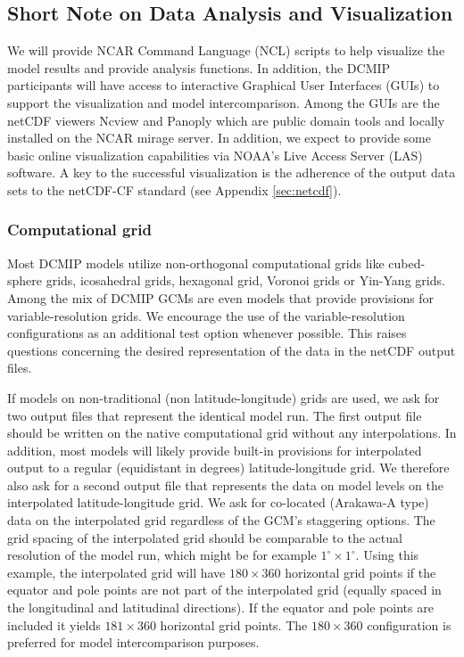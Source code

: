 \documentclass[times,doublespace]{fldauth}
\begin{document}
\subsection{Short Note on Data Analysis and Visualization}
We will provide NCAR Command Language (NCL) scripts to help visualize the model results and provide analysis functions. In addition, the DCMIP participants will have access to interactive Graphical User Interfaces (GUIs) to support the visualization and model intercomparison. Among the GUIs are the netCDF viewers Ncview and Panoply which are public domain tools and locally installed on the NCAR mirage server. In addition, we expect to provide some basic online visualization capabilities via NOAA's Live Access Server (LAS) software. A key to the successful visualization is the adherence of the output data sets to the netCDF-CF standard (see Appendix \ref{sec:netcdf}).

\subsubsection{Computational grid}
Most DCMIP models utilize non-orthogonal computational grids like cubed-sphere grids, icosahedral grids, hexagonal grid, Voronoi grids or Yin-Yang grids. Among the mix of DCMIP GCMs are even models that provide provisions for variable-resolution grids. We encourage the use of the variable-resolution configurations as an additional test option whenever possible.
This raises questions concerning the desired representation of the data in the netCDF output files. 

If models on non-traditional (non latitude-longitude) grids are used, we ask for two output files that represent the identical model run. The first output file should be written on the native computational grid without any interpolations. In addition, most models will likely provide built-in provisions for interpolated output to a regular (equidistant in degrees) latitude-longitude grid. We therefore also ask for a second output file that represents the data on model levels on the interpolated latitude-longitude grid. We ask for co-located  (Arakawa-A type) data on the interpolated grid regardless of the GCM's staggering options. The grid spacing of the interpolated grid should be comparable to the actual resolution of the model run, which might be for example $1^\circ \times 1^\circ$. Using this example, the interpolated grid will have $180 \times 360$ horizontal grid points if the equator and pole points are not part of the interpolated grid (equally spaced in the longitudinal and latitudinal directions). If the equator and pole points are included it yields $181 \times 360$ horizontal grid points. The $180 \times 360$ configuration is preferred for model intercomparison purposes.
\end{document}
